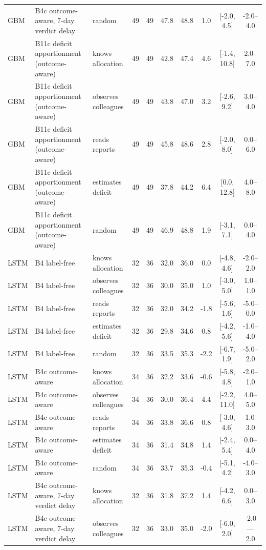 \documentclass[10pt,onecolumn,letterpaper]{article}
\begin{document}
\begin{table}[!t]
\begin{tabular}{lllccccccc}
GBM & B4c outcome-aware, 7-day verdict delay & random & 49 & 49 & 47.8 & 48.8 & 1.0 & [-2.0, 4.5] & -2.0--4.0 \\
GBM & B11c deficit apportionment (outcome-aware) & knows allocation & 49 & 49 & 42.8 & 47.4 & 4.6 & [-1.4, 10.8] & 2.0--7.0 \\
GBM & B11c deficit apportionment (outcome-aware) & observes colleagues & 49 & 49 & 43.8 & 47.0 & 3.2 & [-2.6, 9.2] & 3.0--4.0 \\
GBM & B11c deficit apportionment (outcome-aware) & reads reports & 49 & 49 & 45.8 & 48.6 & 2.8 & [-2.0, 8.0] & 0.0--6.0 \\
GBM & B11c deficit apportionment (outcome-aware) & estimates deficit & 49 & 49 & 37.8 & 44.2 & 6.4 & [0.0, 12.8] & 4.0--8.0 \\
GBM & B11c deficit apportionment (outcome-aware) & random & 49 & 49 & 46.9 & 48.8 & 1.9 & [-3.1, 7.1] & 0.0--4.0 \\
LSTM & B4 label-free & knows allocation & 32 & 36 & 32.0 & 36.0 & 0.0 & [-4.8, 4.6] & -2.0--2.0 \\
LSTM & B4 label-free & observes colleagues & 32 & 36 & 30.0 & 35.0 & 1.0 & [-3.0, 5.0] & 1.0--1.0 \\
LSTM & B4 label-free & reads reports & 32 & 36 & 32.0 & 34.2 & -1.8 & [-5.6, 1.6] & -5.0--0.0 \\
LSTM & B4 label-free & estimates deficit & 32 & 36 & 29.8 & 34.6 & 0.8 & [-4.2, 5.6] & -1.0--4.0 \\
LSTM & B4 label-free & random & 32 & 36 & 33.5 & 35.3 & -2.2 & [-6.7, 1.9] & -5.0--2.0 \\
LSTM & B4c outcome-aware & knows allocation & 34 & 36 & 32.2 & 33.6 & -0.6 & [-5.8, 4.8] & -2.0--1.0 \\
LSTM & B4c outcome-aware & observes colleagues & 34 & 36 & 30.0 & 36.4 & 4.4 & [-2.2, 11.0] & 4.0--5.0 \\
LSTM & B4c outcome-aware & reads reports & 34 & 36 & 33.8 & 36.6 & 0.8 & [-3.0, 4.6] & -1.0--3.0 \\
LSTM & B4c outcome-aware & estimates deficit & 34 & 36 & 31.4 & 34.8 & 1.4 & [-2.4, 5.4] & 0.0--4.0 \\
LSTM & B4c outcome-aware & random & 34 & 36 & 33.7 & 35.3 & -0.4 & [-5.1, 4.2] & -4.0--3.0 \\
LSTM & B4c outcome-aware, 7-day verdict delay & knows allocation & 32 & 36 & 31.8 & 37.2 & 1.4 & [-4.2, 6.6] & 0.0--3.0 \\
LSTM & B4c outcome-aware, 7-day verdict delay & observes colleagues & 32 & 36 & 33.0 & 35.0 & -2.0 & [-6.0, 2.0] & -2.0---2.0 \\

\end{tabular}
\end{table}
\end{document}
